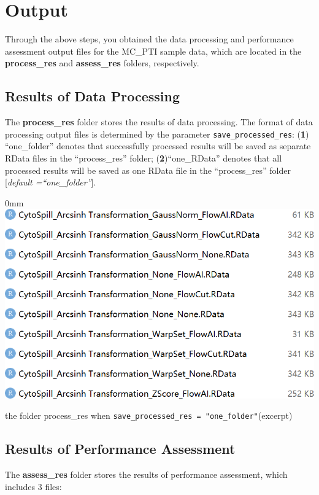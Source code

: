 \documentclass[]{article}
\begin{document}
\section{Output}\label{output}

Through the above steps, you obtained the data processing and performance assessment output files for the MC\_PTI sample data, which are located in the \textbf{process\_res} and \textbf{assess\_res} folders, respectively.

\subsection{Results of Data Processing}\label{results-of-data-processing}

The \textbf{process\_res} folder stores the results of data processing. The format of data processing output files is determined by the parameter \texttt{save\_processed\_res}: (\textbf{1}) ``one\_folder'' denotes that successfully processed results will be saved as separate RData files in the ``process\_res'' folder; (\textbf{2})``one\_RData'' denotes that all processed results will be saved as one RData file in the ``process\_res'' folder {[}\emph{default =``one\_folder''}{]}.

\begin{adjustwidth}{\fltoffset}{0mm}
\includegraphics[width=0.7\linewidth,style="margin-left: 30px;"]{figures/process_res} \end{adjustwidth}

the folder process\_res when \texttt{save\_processed\_res = "one\_folder"}(excerpt)

\subsection{Results of Performance Assessment}\label{results-of-performance-assessment}

The \textbf{assess\_res} folder stores the results of performance assessment, which includes 3 files:
\end{document}
